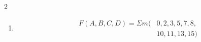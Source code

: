 \documentclass[a4paper,12pt]{article}
\begin{document}
\begin{multicols}{2}
\begin{enumerate}[leftmargin=*]
\begin{enumerate}[label=(\Alph*)]
    \item
    \[
    \begin{aligned}
        F(A,B,C,D) = \Sigma m(&0,2,3,5,7,8,\\
                              &10,11,13,15)
    \end{aligned}
    \]

\end{enumerate}

\end{enumerate}

\end{multicols}

\vfill
\end{document}
